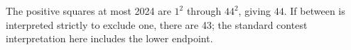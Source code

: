 The positive squares at most 2024 are $1^2$ through $44^2$, giving $\boxed{44}$. If between is interpreted strictly to exclude one, there are 43; the standard contest interpretation here includes the lower endpoint.
